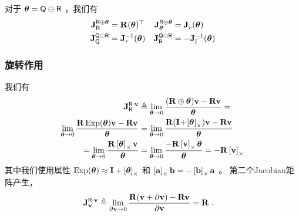 对于 $\bth=\sQ\om\sR$ ，我们有
%
\begin{align}
\mjac{\sR\op\bth}{\sR}   
 &= \bfR(\bth)\tr 
 &
\mjac{\sR\op\bth}{\bth} 
 &= \mjac{}{r}(\bth)
 \\
\mjac{\sQ\om\sR}{\sQ} 
 &= \mjac{-1}{r}(\bth)
 &
\mjac{\sQ\om\sR}{\sR} 
 &= -\mjac{-1}{l}(\bth) 
\end{align}
%


\subsubsection{旋转作用} 
\label{sec:jac_SO3_action}

我们有
\begin{align}
\mjac{\sR\cdot\bfv}{\sR} 
\small
&\te \lim_{\bth\to0}\frac{(\bfR\op\bth)\bfv-\bfR\bfv}{\bth} = \notag \\
\lim_{\bth\to0}\frac{\bfR\Exp(\bth)\bfv-\bfR\bfv}{\bth} 
&= \lim_{\bth\to0}\frac{\bfR(\bfI\!+\!\hatx{\bth})\bfv-\bfR\bfv}{\bth} \notag \\
= \lim_{\bth\to0}\frac{\bfR\hatx{\bth}\bfv}{\bth} 
&= \lim_{\bth\to0}\frac{-\bfR\hatx{\bfv}\bth}{\bth} 
= -\bfR\hatx{\bfv} 
\end{align}
%
其中我们使用属性 $\Exp(\bth) \approx \bfI + \hatx{\bth}$ 和 $\hatx{\bfa}\bfb = -\hatx{\bfb}\bfa$ 。
第二个Jacobian矩阵产生，
%
\begin{align}
\mjac{\sR\cdot\bfv}{\bfv}
&\te \lim_{\partial\bfv\to0}\frac{\bfR(\bfv+\partial\bfv)-\bfR\bfv}{\partial\bfv} 
= \bfR
~.
\end{align}



